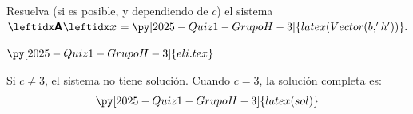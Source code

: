 \begin{exercise}
\begin{parts}
   \item 
     Resuelva (si es posible, y dependiendo de $c$) el sistema
     \begin{math}
       \MV{A}{x}=\py[2025-Quiz1-GrupoH-3]{latex(Vector(b,'h'))}.
     \end{math}
     
     \begin{solution}[]
       $\py[2025-Quiz1-GrupoH-3]{eli.tex}$
       \medskip
       
       Si $c\neq3$, el sistema no tiene solución. 
       Cuando $c=3$, la solución completa es:
       \begin{displaymath}
         \py[2025-Quiz1-GrupoH-3]{latex(sol)}
       \end{displaymath}
     \end{solution}
     
   \end{parts}
\end{exercise}

